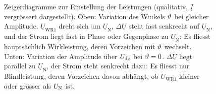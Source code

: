 \begin{figure}[htbp]
  \medskip
  \caption{Zeigerdiagramme zur Einstellung der Leistungen (qualitativ, $\underline I$ vergrössert dargestellt). Oben: Variation des Winkels $\vartheta$ bei gleicher Amplitude. $\underline U_{\mathrm{WR1}}$ dreht sich um $\underline U_{\mathrm N}$, $\Delta\underline U$ steht fast senkrecht auf $\underline U_{\mathrm N}$, und der Strom liegt fast in Phase oder Gegenphase zu $\underline U_{\mathrm N}$: Es fliesst hauptsächlich Wirkleistung, deren Vorzeichen mit $\vartheta$ wechselt. Unten: Variation der Amplitude über $U_{\mathrm{dc}}$ bei $\vartheta=0$. $\Delta\underline U$ liegt parallel zu $\underline U_{\mathrm N}$, der Strom steht senkrecht dazu: Es fliesst nur Blindleistung, deren Vorzeichen davon abhängt, ob $U_{\mathrm{WR1}}$ kleiner oder grösser als $U_{\mathrm{N}}$ ist.}
  \label{fig:zeiger612}
\end{figure}
